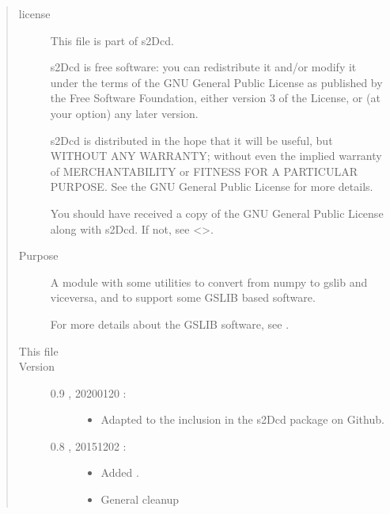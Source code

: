 \documentclass[letterpaper,10pt,english]{sphinxmanual}
\begin{document}
\label{\detokenize{appendices:module-s2Dcd.gslibnumpy}}\label{\detokenize{appendices:the-s2dcd-gslibnumpy-module}}\begin{quote}\begin{description}
\item[{license}] \leavevmode
This file is part of s2Dcd.

s2Dcd is free software: you can redistribute it and/or modify
it under the terms of the GNU General Public License as published by
the Free Software Foundation, either version 3 of the License, or
(at your option) any later version.

s2Dcd is distributed in the hope that it will be useful,
but WITHOUT ANY WARRANTY; without even the implied warranty of
MERCHANTABILITY or FITNESS FOR A PARTICULAR PURPOSE.  See the
GNU General Public License for more details.

You should have received a copy of the GNU General Public License
along with s2Dcd.  If not, see \textless{}\textgreater{}.

\item[{Purpose}] \leavevmode
A module with some utilities to convert from numpy to gslib and
vice\sphinxhyphen{}versa, and to support some GSLIB based software.

For more details about the GSLIB software, see  .

\item[{This file}] \leavevmode
{}

\item[{Version}] \leavevmode\begin{description}
\item[{0.9 , 2020\sphinxhyphen{}01\sphinxhyphen{}20 :}] \leavevmode\begin{itemize}
\item {} 
Adapted to the inclusion in the s2Dcd package on Github.

\end{itemize}

\item[{0.8 , 2015\sphinxhyphen{}12\sphinxhyphen{}02 :}] \leavevmode\begin{itemize}
\item {} 
Added .

\item {} 
General clean\sphinxhyphen{}up


\end{itemize}
\end{description}
\end{description}
\end{quote}
\end{document}
